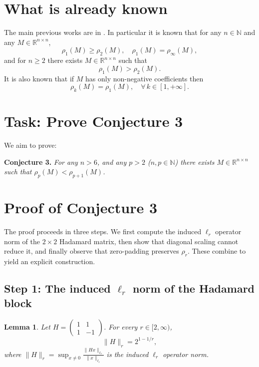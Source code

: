 \documentclass{article}
\begin{document}
\section*{What is already known}

The main previous works are in \cite{coron2008,coron2015}. In particular it is known that for any $n \in \mathbb{N}$ and any $M \in \mathbb{R}^{n \times n}$,
\begin{equation}
\rho_1(M) \geq \rho_2(M), \quad \rho_1(M) = \rho_\infty(M),
\end{equation}
and for $n \geq 2$ there exists $M \in \mathbb{R}^{n \times n}$ such that
\begin{equation}
\rho_1(M) > \rho_2(M).
\end{equation}
It is also known \cite{rump2003} that if $M$ has only non-negative coefficients then
\begin{equation}
\rho_k(M) = \rho_1(M), \quad \forall\, k \in [1, +\infty].
\end{equation}

\section*{Task: Prove Conjecture 3}

We aim to prove:

\medskip
\noindent\textbf{Conjecture 3.} \textit{For any $n > 6$, and any $p > 2$ ($n, p \in \mathbb{N}$) there exists $M \in \mathbb{R}^{n \times n}$ such that $\rho_p(M) < \rho_{p+1}(M)$.}

\newtheorem{lemma}{Lemma}
\newtheorem{theorem}{Theorem}

\section*{Proof of Conjecture 3}

The proof proceeds in three steps. We first compute the induced $\ell_r$ operator norm of the $2\times 2$ Hadamard matrix, then show that diagonal scaling cannot reduce it, and finally observe that zero-padding preserves $\rho_r$. These combine to yield an explicit construction.

\subsection*{Step 1: The induced $\ell_r$ norm of the Hadamard block}

\begin{lemma}\label{lem:hadamard-norm}
Let $H = \begin{pmatrix} 1 & 1 \\ 1 & -1 \end{pmatrix}$. For every $r \in [2,\infty)$,
\[
\|H\|_r = 2^{1-1/r},
\]
where $\|H\|_r = \sup_{x \neq 0} \frac{\|Hx\|_{\ell_r}}{\|x\|_{\ell_r}}$ is the induced $\ell_r$ operator norm.
\end{lemma}
\end{document}
